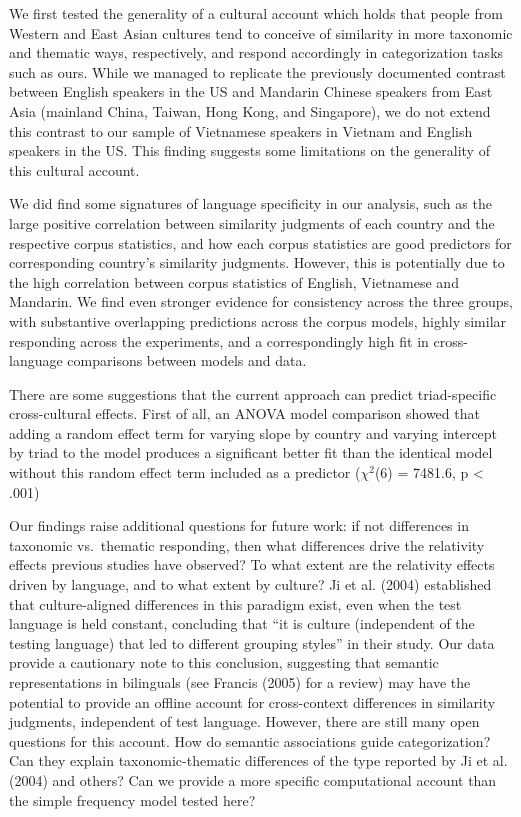 \documentclass[10pt, letterpaper]{article}
\begin{document}
We first tested the generality of a cultural account which holds that
people from Western and East Asian cultures tend to conceive of
similarity in more taxonomic and thematic ways, respectively, and
respond accordingly in categorization tasks such as ours. While we
managed to replicate the previously documented contrast between English
speakers in the US and Mandarin Chinese speakers from East Asia
(mainland China, Taiwan, Hong Kong, and Singapore), we do not extend
this contrast to our sample of Vietnamese speakers in Vietnam and
English speakers in the US. This finding suggests some limitations on
the generality of this cultural account.

We did find some signatures of language specificity in our analysis,
such as the large positive correlation between similarity judgments of
each country and the respective corpus statistics, and how each corpus
statistics are good predictors for corresponding country's similarity
judgments. However, this is potentially due to the high correlation
between corpus statistics of English, Vietnamese and Mandarin. We find
even stronger evidence for consistency across the three groups, with
substantive overlapping predictions across the corpus models, highly
similar responding across the experiments, and a correspondingly high
fit in cross-language comparisons between models and data.

There are some suggestions that the current approach can predict
triad-specific cross-cultural effects. First of all, an ANOVA model
comparison showed that adding a random effect term for varying slope by
country and varying intercept by triad to the model produces a
significant better fit than the identical model without this random
effect term included as a predictor (\(\chi^2\)(6) = 7481.6, p
\textless{} .001)

Our findings raise additional questions for future work: if not
differences in taxonomic vs.~thematic responding, then what differences
drive the relativity effects previous studies have observed? To what
extent are the relativity effects driven by language, and to what extent
by culture? Ji et al. (2004) established that culture-aligned
differences in this paradigm exist, even when the test language is held
constant, concluding that ``it is culture (independent of the testing
language) that led to different grouping styles'' in their study. Our
data provide a cautionary note to this conclusion, suggesting that
semantic representations in bilinguals (see Francis (2005) for a review)
may have the potential to provide an offline account for cross-context
differences in similarity judgments, independent of test language.
However, there are still many open questions for this account. How do
semantic associations guide categorization? Can they explain
taxonomic-thematic differences of the type reported by Ji et al. (2004)
and others? Can we provide a more specific computational account than
the simple frequency model tested here?
\end{document}
